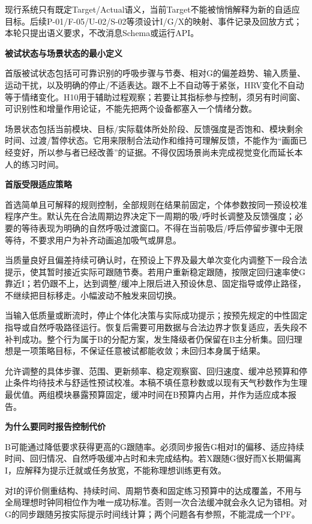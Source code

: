 \documentclass[11pt,a4paper]{article}
\newcommand{\reviewsubsection}[1]{\par\Needspace{4\baselineskip}\vspace{4pt}\begin{center}{\titlelatin\titlecjk\bfseries\fontsize{12}{18}\selectfont #1}\end{center}}
\begin{document}
现行系统只有既定Target/\allowbreak{}Actual语义，当前Target不能被悄悄解释为新的自适应目标。后续P-\allowbreak{}01/\allowbreak{}F-\allowbreak{}05/\allowbreak{}U-\allowbreak{}02/\allowbreak{}S-\allowbreak{}02等须设计I/\allowbreak{}G/\allowbreak{}X的映射、事件记录及回放方式；本轮只提出语义要求，不改消息Schema或运行API。


\reviewsubsection{3.2 被试状态与场景状态的最小定义}
首版被试状态包括可可靠识别的呼吸步骤与节奏、相对G的偏差趋势、输入质量、运动干扰，以及明确的停止/\allowbreak{}不适表达。跟不上不自动等于紧张，HRV变化不自动等于情绪变化。H10用于辅助过程观察；若要让其指标参与控制，须另有时间窗、可识别性和增量作用论证，不能先把两个设备都塞入一个情绪分数。


场景状态包括当前模块、目标/\allowbreak{}实际载体所处阶段、反馈强度是否饱和、模块剩余时间、过渡/\allowbreak{}暂停状态。它用来限制合法动作和维持可理解反馈，不能作为“画面已经变好，所以参与者已经改善”的证据。不得仅因场景尚未完成视觉变化而延长本人的练习时间。


\reviewsubsection{3.3 首版受限适应策略}
首选简单且可解释的规则控制，全部规则在结果前固定，个体参数按同一预设校准程序产生。默认先在合法周期边界决定下一周期的吸/\allowbreak{}呼时长调整及反馈强度；必要的等待表现为明确的自然呼吸过渡窗口。不得在当前吸后/\allowbreak{}呼后停留步骤中无限等待，不要求用户为补齐动画追加吸气或屏息。


当质量良好且偏差持续可确认时，在预设上下界及最大单次变化内调整下一段合法提示，使其暂时接近实际可跟随节奏。若用户重新稳定跟随，按限定回归速率使G靠近I；若仍跟不上，达到调整/\allowbreak{}缓冲上限后进入预设休息、固定指导或停止路径，不继续把目标移走。小幅波动不触发来回切换。


当输入低质量或断流时，停止个体化决策与实际成功提示；按预先规定的中性固定指导或自然呼吸路径运行。恢复后需要可用数据与合法边界才恢复适应，丢失段不补判成功。整个行为属于B的分配方案，发生降级者仍保留在B主分析集。回归理想是一项策略目标，不保证任意被试都能收敛；未回归本身属于结果。


允许调整的具体步骤、范围、更新频率、稳定观察窗、回归速度、缓冲总预算和停止条件均待技术与舒适性预试校准。本稿不填任意秒数或以现有天气秒数作为生理最优值。两组模块暴露预算固定，缓冲时间在B预算内占用，并作为适应成本报告。


\reviewsubsection{3.4 为什么要同时报告控制代价}
B可能通过降低要求获得更高的G跟随率。必须同步报告G相对I的偏移、适应持续时间、回归情况、自然呼吸缓冲占时和未完成结构。若X跟随G很好而X长期偏离I，应解释为提示迁就或任务放宽，不能称理想训练更有效。


对I的评价侧重结构、持续时间、周期节奏和固定练习预算中的达成覆盖，不用与全局理想时钟同相位作为唯一成功标准。否则一次合法缓冲就会永久记为错相。对G的同步跟随另按实际提示时间线计算；两个问题各有参照，不能混成一个PF。
\end{document}
